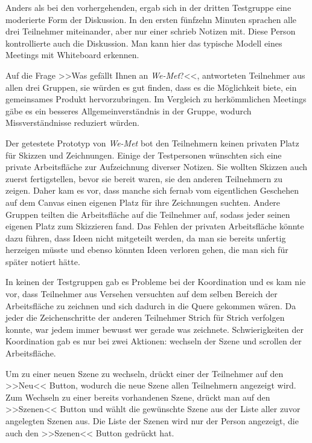 \medskip Anders als bei den vorhergehenden, ergab sich in der dritten Testgruppe eine moderierte Form der Diskussion. In den ersten fünfzehn Minuten sprachen alle drei Teilnehmer miteinander, aber nur einer schrieb Notizen mit. Diese Person kontrollierte auch die Diskussion. Man kann hier das typische Modell eines Meetings mit Whiteboard erkennen.
	
\medskip Auf die Frage >>Was gefällt Ihnen an \emph{We-Met}?<<, antworteten Teilnehmer aus allen drei Gruppen, sie würden es gut finden, dass es die Möglichkeit biete, ein gemeinsames Produkt hervorzubringen. Im Vergleich zu herkömmlichen Meetings gäbe es ein besseres Allgemeinverständnis in der Gruppe, wodurch Missverständnisse reduziert würden.
	
\medskip Der getestete Prototyp von \emph{We-Met} bot den Teilnehmern keinen privaten Platz für Skizzen und Zeichnungen. Einige der Testpersonen wünschten sich eine private Arbeitsfläche zur Aufzeichnung diverser Notizen. Sie wollten Skizzen auch zuerst fertigstellen, bevor sie bereit waren, sie den anderen Teilnehmern zu zeigen. Daher kam es vor, dass manche sich fernab vom eigentlichen Geschehen auf dem Canvas einen eigenen Platz für ihre Zeichnungen suchten. Andere Gruppen teilten die Arbeitsfläche auf die Teilnehmer auf, sodass jeder seinen eigenen Platz zum Skizzieren fand. Das Fehlen der privaten Arbeitsfläche könnte dazu führen, dass Ideen nicht mitgeteilt werden, da man sie bereits unfertig herzeigen müsste und ebenso könnten Ideen verloren gehen, die man sich für später notiert hätte.
	
\medskip In keinen der Testgruppen gab es Probleme bei der Koordination und es kam nie vor, dass Teilnehmer aus Versehen versuchten auf dem selben Bereich der Arbeitsfläche zu zeichnen und sich dadurch in die Quere gekommen wären. Da jeder die Zeichenschritte der anderen Teilnehmer Strich für Strich verfolgen konnte, war jedem immer bewusst wer gerade was zeichnete. Schwierigkeiten der Koordination gab es nur bei zwei Aktionen: wechseln der Szene und scrollen der Arbeitsfläche.
	
\medskip Um zu einer neuen Szene zu wechseln, drückt einer der Teilnehmer auf den >>Neu<< Button, wodurch die neue Szene allen Teilnehmern angezeigt wird. Zum Wechseln zu einer bereits vorhandenen Szene, drückt man auf den >>Szenen<< Button und wählt die gewünschte Szene aus der Liste aller zuvor angelegten Szenen aus. Die Liste der Szenen wird nur der Person angezeigt, die auch den >>Szenen<< Button gedrückt hat.
	
